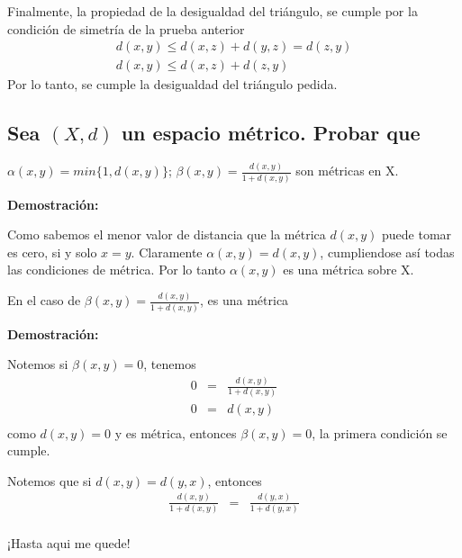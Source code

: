 \documentclass[
]{article}
\begin{document}
Finalmente, la propiedad de la desigualdad del triángulo, se cumple por
la condición de simetría de la prueba anterior \begin{eqnarray*}
d(x,y) \leq  d(x,z) + d(y,z)=d(z,y)\\
d(x,y) \leq  d(x,z) + d(z,y)
\end{eqnarray*} Por lo tanto, se cumple la desigualdad del triángulo
pedida.

\hypertarget{sea-xd-un-espacio-muxe9trico.-probar-que}{%
\subsection{\texorpdfstring{Sea \((X,d)\) un espacio métrico. Probar
que}{Sea (X,d) un espacio métrico. Probar que}}\label{sea-xd-un-espacio-muxe9trico.-probar-que}}

\(\alpha (x,y)=min \{1,d(x,y)\}\);
\(\beta (x,y)= \frac{d(x,y)}{1+d(x,y)}\) son métricas en X.

\textbf{Demostración:}

Como sabemos el menor valor de distancia que la métrica \(d(x,y)\) puede
tomar es cero, si y solo \(x=y\). Claramente \(\alpha (x,y)=d(x,y)\),
cumpliendose así todas las condiciones de métrica. Por lo tanto
\(\alpha (x,y)\) es una métrica sobre X.

En el caso de \(\beta (x,y)= \frac{d(x,y)}{1+d(x,y)}\), es una métrica

\textbf{Demostración:}

Notemos si \(\beta (x,y)=0\), tenemos \begin{eqnarray*}
0 & = & \frac{d(x,y)}{1+d(x,y)}\\
0 & = & d(x,y)\\
\end{eqnarray*} como \(d(x,y)=0\) y es métrica, entonces
\(\beta (x,y)=0\), la primera condición se cumple.

Notemos que si \(d(x,y)=d(y,x)\), entonces \begin{eqnarray*}
\frac{d(x,y)}{1+d(x,y)} & = & \frac{d(y,x)}{1+d(y,x)}\\
\end{eqnarray*}

¡Hasta aqui me quede!
\end{document}
